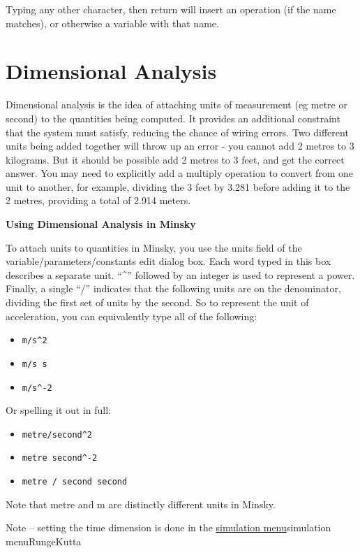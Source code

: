 Typing any other character, then return will insert an operation (if
the name matches), or otherwise a variable with that name.

\section{Dimensional Analysis}

Dimensional analysis is the idea of attaching units of measurement (eg
metre or second) to the quantities being computed. It provides an
additional constraint that the system must satisfy, reducing the
chance of wiring errors. Two different units being added together will
throw up an error - you cannot add 2 metres to 3 kilograms. But it
should be possible add 2 metres to 3 feet, and get the correct
answer. You may need to explicitly add a multiply operation to convert
from one unit to another, for example, dividing the 3 feet by 3.281
before adding it to the 2 metres, providing a total of 2.914 meters.

\textbf{Using Dimensional Analysis in Minsky}

To attach units to quantities in Minsky, you use the units field of
the variable/parameters/constants edit dialog box. Each word typed in
this box describes a separate unit. ``\^{}'' followed by an integer is
used to represent a power. Finally, a single ``/'' indicates that the
following units are on the denominator, dividing the first set of
units by the second. So to represent the unit of acceleration, you can
equivalently type all of the following:

\begin{itemize}
\item \verb+m/s^2+
\item \verb+m/s s+
\item \verb+m/s^-2+
\end{itemize}

Or spelling it out in full:

\begin{itemize}
\item \verb+metre/second^2+
\item \verb+metre second^-2+
\item \verb+metre / second second+
\end{itemize}

Note that metre and m are distinctly different units in Minsky.

Note -- setting the time dimension is done in the
\hyperref[ref]{simulation menu}{simulation menu}{}{RungeKutta}

